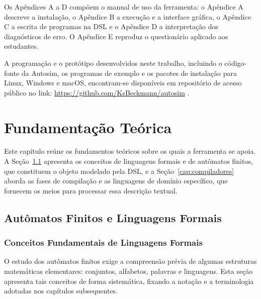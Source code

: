 \documentclass[
    12pt
    ,oneside
    ,a4paper
    ,chapter=TITLE
    ,section=TITLE
    ,sumario=abnt-6027-2012]{abntex2}
\begin{document}
Os Apêndices A a D compõem o manual de uso da ferramenta: o Apêndice A descreve a instalação,
o Apêndice B a execução e a interface gráfica, o Apêndice C a escrita de programas na DSL e o
Apêndice D a interpretação dos diagnósticos de erro. O Apêndice E reproduz o questionário
aplicado aos estudantes.

A programação e o protótipo desenvolvidos neste trabalho, incluindo o código-fonte da
Autosim, os programas de exemplo e os pacotes de instalação para Linux, Windows e macOS,
encontram-se disponíveis em repositório de acesso público no link:
\mbox{\url{https://github.com/KsBeckmann/autosim}} \cite{autosim2026}.

\chapter{Fundamentação Teórica}
\label{cap:fundamentacao}
Este capítulo reúne os fundamentos teóricos sobre os quais a ferramenta se apoia. A
Seção~\ref{cap:automatos} apresenta os conceitos de linguagens formais e de autômatos
finitos, que constituem o objeto modelado pela DSL, e a Seção~\ref{cap:compiladores}
aborda as fases de compilação e as linguagens de domínio específico, que fornecem os
meios para processar essa descrição textual.

\section{Autômatos Finitos e Linguagens Formais}
\label{cap:automatos}

\subsection{Conceitos Fundamentais de Linguagens Formais}
\label{sec:linguagens-formais}
O estudo dos autômatos finitos exige a compreensão prévia de algumas estruturas matemáticas
elementares: conjuntos, alfabetos, palavras e linguagens. Esta seção apresenta tais conceitos de
forma sistemática, fixando a notação e a terminologia adotadas nos capítulos subsequentes.
\end{document}
